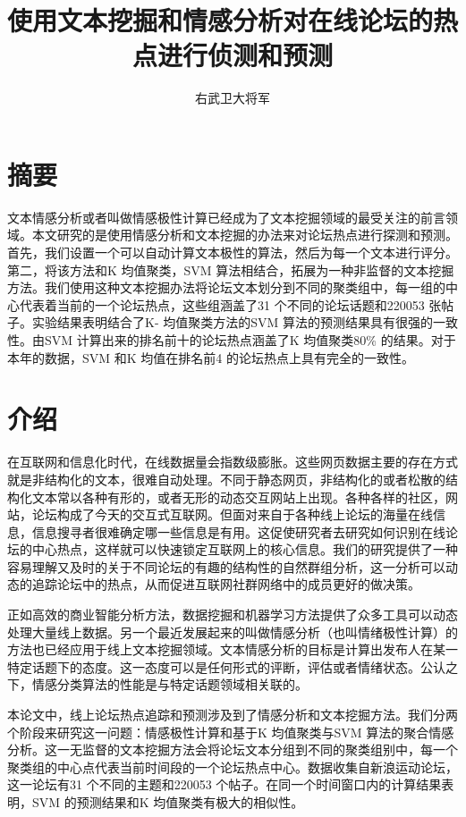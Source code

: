 \documentclass{ctexart}
\author{右武卫大将军}
\title{使用文本挖掘和情感分析对在线论坛的热点进行侦测和预测}
\begin{document}
    \maketitle
    \section{摘要}
        文本情感分析或者叫做情感极性计算已经成为了文本挖掘领域的最受关注的前言领域。本文研究的是使用情感分析和文本挖掘的办法来对论坛热点进行探测和预测。首先，我们设置一个可以自动计算文本极性的算法，然后为每一个文本进行评分。第二，将该方法和K 均值聚类，SVM 算法相结合，拓展为一种非监督的文本挖掘方法。我们使用这种文本挖掘办法将论坛文本划分到不同的聚类组中，每一组的中心代表着当前的一个论坛热点，这些组涵盖了31 个不同的论坛话题和220053 张帖子。实验结果表明结合了K- 均值聚类方法的SVM 算法的预测结果具有很强的一致性。由SVM 计算出来的排名前十的论坛热点涵盖了K 均值聚类80\% 的结果。对于本年的数据，SVM 和K 均值在排名前4 的论坛热点上具有完全的一致性。
    \section{介绍}
        在互联网和信息化时代，在线数据量会指数级膨胀。这些网页数据主要的存在方式就是非结构化的文本，很难自动处理。不同于静态网页，非结构化的或者松散的结构化文本常以各种有形的，或者无形的动态交互网站上出现。各种各样的社区，网站，论坛构成了今天的交互式互联网。但面对来自于各种线上论坛的海量在线信息，信息搜寻者很难确定哪一些信息是有用。这促使研究者去研究如何识别在线论坛的中心热点，这样就可以快速锁定互联网上的核心信息。我们的研究提供了一种容易理解又及时的关于不同论坛的有趣的结构性的自然群组分析，这一分析可以动态的追踪论坛中的热点，从而促进互联网社群网络中的成员更好的做决策。

        正如高效的商业智能分析方法，数据挖掘和机器学习方法提供了众多工具可以动态处理大量线上数据。另一个最近发展起来的叫做情感分析（也叫情绪极性计算）的方法也已经应用于线上文本挖掘领域。文本情感分析的目标是计算出发布人在某一特定话题下的态度。这一态度可以是任何形式的评断，评估或者情绪状态。公认之下，情感分类算法的性能是与特定话题领域相关联的。

        本论文中，线上论坛热点追踪和预测涉及到了情感分析和文本挖掘方法。我们分两个阶段来研究这一问题：情感极性计算和基于K 均值聚类与SVM 算法的聚合情感分析。这一无监督的文本挖掘方法会将论坛文本分组到不同的聚类组别中，每一个聚类组的中心点代表当前时间段的一个论坛热点中心。数据收集自新浪运动论坛，这一论坛有31 个不同的主题和220053 个帖子。在同一个时间窗口内的计算结果表明，SVM 的预测结果和K 均值聚类有极大的相似性。
\end{document}

